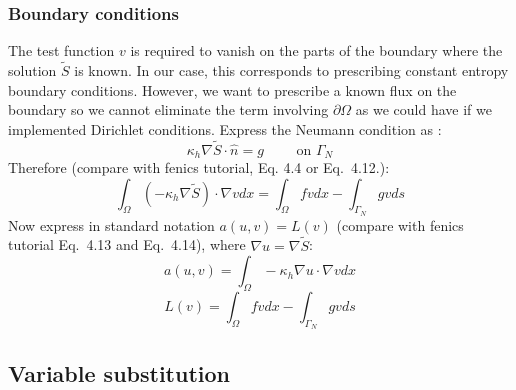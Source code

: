 \subsubsection{Boundary conditions}
The test function $v$ is required to vanish on the parts of the boundary where the solution $\tilde{S}$ is known.  In our case, this corresponds to prescribing constant entropy boundary conditions.  However, we want to prescribe a known flux on the boundary so we cannot eliminate the term involving $\partial \Omega$ as we could have if we implemented Dirichlet conditions.  Express the Neumann condition as :
\begin{equation}
\kappa_h \nabla \tilde{S} \cdot \hat{n} = g \qquad \text{ on } \Gamma_N
\end{equation}
Therefore (compare with fenics tutorial, Eq. 4.4 or Eq.~4.12.):
\begin{equation}
\int_\Omega \left(-\kappa_h \nabla \tilde{S} \right) \cdot \nabla v dx = \int_\Omega f v dx -  \int_{\Gamma_N} g v ds
\end{equation}
Now express in standard notation $a(u,v)=L(v)$ (compare with fenics tutorial Eq.~4.13 and Eq.~4.14), where $\nabla u= \nabla \tilde{S}$:
\begin{equation}
a(u,v) = \int_\Omega -\kappa_h \nabla u \cdot \nabla v dx
\end{equation}
\begin{equation}
L(v) = \int_\Omega f v dx - \int_{\Gamma_N} g v ds
\end{equation}
\subsection{Variable substitution}

\\

